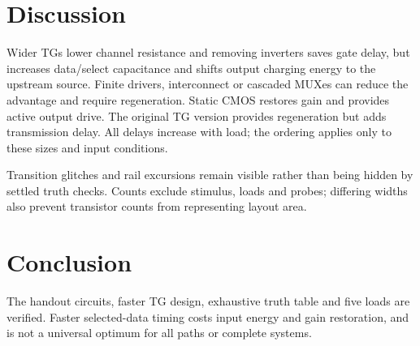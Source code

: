\section{Discussion}
Wider TGs lower channel resistance and removing inverters saves gate delay, but increases data/select capacitance and shifts output charging energy to the upstream source. Finite drivers, interconnect or cascaded MUXes can reduce the advantage and require regeneration. Static CMOS restores gain and provides active output drive. The original TG version provides regeneration but adds transmission delay. All delays increase with load; the ordering applies only to these sizes and input conditions.

Transition glitches and rail excursions remain visible rather than being hidden by settled truth checks. Counts exclude stimulus, loads and probes; differing widths also prevent transistor counts from representing layout area.

\section{Conclusion}
The handout circuits, faster TG design, exhaustive truth table and five loads are verified. Faster selected-data timing costs input energy and gain restoration, and is not a universal optimum for all paths or complete systems.
